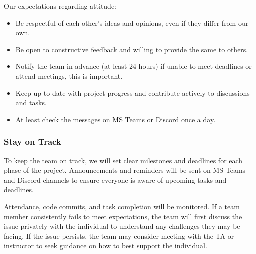 \documentclass{article}
\begin{document}
\begin{enumerate}
\begin{itemize}

Our expectations regarding attitude:
\begin{itemize}
  \item Be respectful of each other's ideas and opinions, even if they differ from our own.
  \item Be open to constructive feedback and willing to provide the same to others.
  \item Notify the team in advance (at least 24 hours) if unable to meet deadlines or attend meetings, this is important.
  \item Keep up to date with project progress and contribute actively to discussions and tasks.
  \item At least check the messages on MS Teams or Discord once a day.
\end{itemize}

\subsubsection*{Stay on Track}



To keep the team on track, we will set clear milestones and deadlines for each phase of the project.
Announcements and reminders will be sent on MS Teams and Discord channels
to ensure everyone is aware of upcoming tasks and deadlines.

Attendance, code commits, and task completion will be monitored. 
If a team member consistently fails to meet expectations, the team will first discuss the issue privately 
with the individual to understand any challenges they may be facing. If the issue persists, 
the team may consider meeting with the TA or instructor to seek guidance on how to best support the individual.


\end{itemize}
\end{enumerate}
\end{document}

